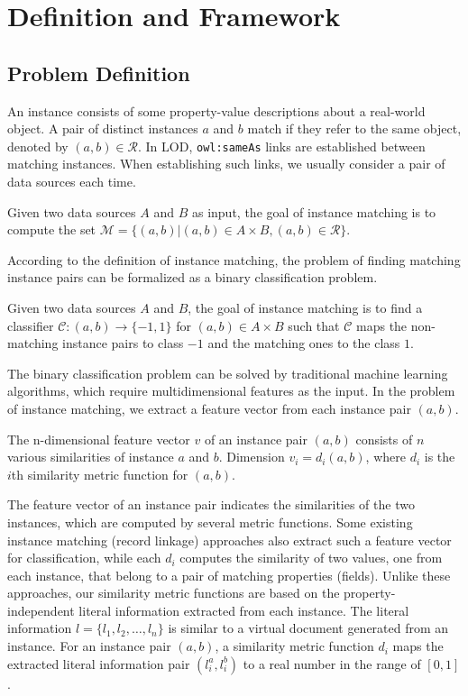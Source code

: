\section{Definition and Framework}
\label{sec:definition&framework}

\subsection{Problem Definition}
\label{sec:definition}

An instance consists of some property-value descriptions about a real-world object. A pair of distinct instances $a$ and $b$ match if they refer to the same object, denoted by $(a,b)\in\mathcal{R}$. In LOD, \texttt{owl:sameAs} links are established between matching instances. When establishing such links, we usually consider a pair of data sources each time.
\begin{definition}
Given two data sources $A$ and $B$ as input, the goal of instance matching is to compute the set $\mathcal{M}=\{(a,b)|(a,b)\in A \times B, (a,b)\in\mathcal{R}\}$.
\end{definition}
According to the definition of instance matching, the problem of finding matching instance pairs can be formalized as a binary classification problem.
\begin{definition}
Given two data sources $A$ and $B$, the goal of instance matching is to find a classifier $\mathcal{C}:(a, b) \to\{-1, 1\}$ for $(a, b)\in A \times B$ such that $\mathcal{C}$ maps the non-matching instance pairs to class $-1$ and the matching ones to the class $1$.
\end{definition}
The binary classification problem can be solved by traditional machine learning algorithms, which require multidimensional features as the input. In the problem of instance matching, we extract a feature vector from each instance pair $(a, b)$.
\begin{definition}
The n-dimensional feature vector $v$ of an instance pair $(a, b)$ consists of $n$ various similarities of instance $a$ and $b$. Dimension $v_i =d_i (a, b)$, where $d_i$ is the $i$th similarity metric function for $(a, b)$.
\end{definition}
The feature vector of an instance pair indicates the similarities of the two instances, which are computed by several metric functions. Some existing instance matching (record linkage\cite{elmagarmid2007duplicate}) approaches also extract such a feature vector for classification, while each $d_i$ computes the similarity of two values, one from each instance, that belong to a pair of matching properties (fields). Unlike these approaches, our similarity metric functions are based on the property-independent literal information extracted from each instance. The literal information $l=\{l_1 , l_2 , \dots , l_n\}$ is similar to a virtual document generated from an instance. For an instance pair $(a, b)$, a similarity metric function $d_i$ maps the extracted literal information pair $(l^a_i, l^b_i)$ to a real number in the range of $[0, 1]$.

